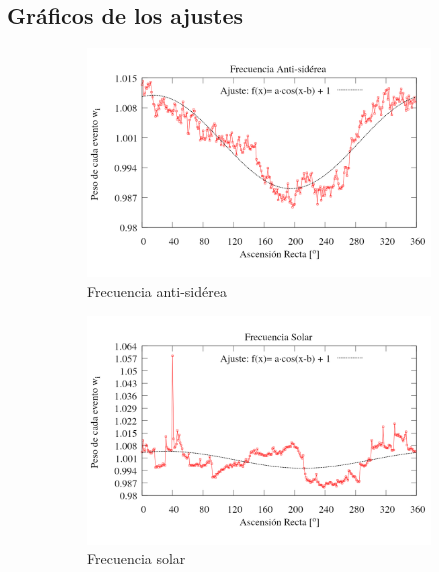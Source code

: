 \subsection{Gráficos de los ajustes}


\begin{figure}[H]
\begin{subfigure}{.5\textwidth}
	\centering
	\includegraphics[width=\linewidth]{eventos_RA_ajuste_cos_antisiderea_v2.png}
	\caption{Frecuencia anti-sidérea}
	\label{fig:ajuste_antisiderea}
\end{subfigure}%
\begin{subfigure}{.5\textwidth}
	\centering
	\includegraphics[width=\linewidth]{eventos_RA_ajuste_cos_solar_v3.png}
	\caption{Frecuencia solar}
	\label{fig:ajuste_solar}
\end{subfigure}\\
\centering
\begin{subfigure}{.5\textwidth}

\end{subfigure}
\end{figure}

